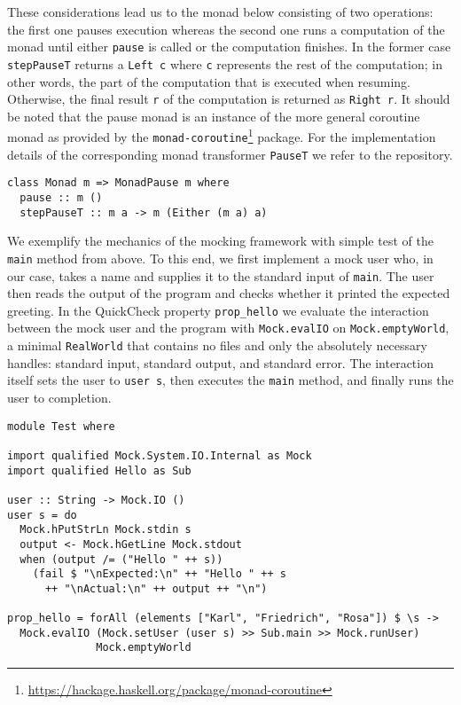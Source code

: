 These considerations lead us to the monad below consisting of two operations: the first one pauses execution whereas the second one runs a computation of the monad until either \texttt{pause} is called or the computation finishes.
In the former case \texttt{stepPauseT} returns a \texttt{Left c} where \texttt{c} represents the rest of the computation; in other words, the part of the computation that is executed when resuming. 
Otherwise, the final result \texttt{r} of the computation is returned as \texttt{Right r}.
It should be noted that the pause monad is an instance of the more general coroutine monad as provided by the \texttt{monad-coroutine}\footnote{\url{https://hackage.haskell.org/package/monad-coroutine}} package.
For the implementation details of the corresponding monad transformer \texttt{PauseT} we refer to the repository.
\begin{verbatim}
class Monad m => MonadPause m where
  pause :: m ()
  stepPauseT :: m a -> m (Either (m a) a)
\end{verbatim}
We exemplify the mechanics of the mocking framework with simple test of the \texttt{main} method from above.
To this end, we first implement a mock user who, in our case, takes a name and supplies it to the standard input of \texttt{main}.
The user then reads the output of the program and checks whether it printed the expected greeting.
In the QuickCheck property \texttt{prop_hello} we evaluate the interaction between the mock user and the program with \texttt{Mock.evalIO} on \texttt{Mock.emptyWorld}, a minimal \texttt{RealWorld} that contains no files and only the absolutely necessary handles: standard input, standard output, and standard error.
The interaction itself sets the user to \texttt{user s}, then executes the \texttt{main} method, and finally runs the user to completion.
\begin{verbatim}
module Test where

import qualified Mock.System.IO.Internal as Mock
import qualified Hello as Sub

user :: String -> Mock.IO ()
user s = do
  Mock.hPutStrLn Mock.stdin s
  output <- Mock.hGetLine Mock.stdout
  when (output /= ("Hello " ++ s))
    (fail $ "\nExpected:\n" ++ "Hello " ++ s
      ++ "\nActual:\n" ++ output ++ "\n")

prop_hello = forAll (elements ["Karl", "Friedrich", "Rosa"]) $ \s ->
  Mock.evalIO (Mock.setUser (user s) >> Sub.main >> Mock.runUser)
              Mock.emptyWorld
\end{verbatim}
